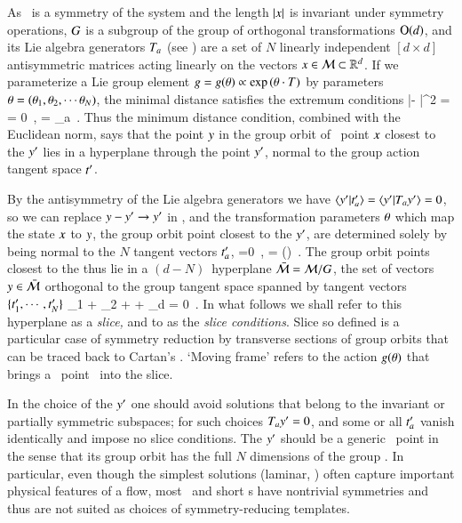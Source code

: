 As \Group\ is a symmetry of the system and the length $|x|$ is
invariant under symmetry operations, $G$ is a subgroup of the group
of orthogonal transformations $\textrm{O}(d)$, and its Lie algebra {generators}
$T_a$ (see ) are a set of $N$ linearly independent
$[d\!\times\!d]$ antisymmetric matrices acting linearly on the {\statesp}
vectors $x \in {\cal M} \subset \mathbb{R}^d$. If we parameterize a Lie group
element $g=g({\bf \theta})\propto\exp{({\ensuremath{{\bf \theta}}} \cdot \ensuremath{T})}$ by
parameters ${\bf \theta} = ({\bf \theta}_1,{\bf \theta}_2,\cdots{\bf \theta}_N)$, the minimal
distance satisfies the extremum conditions
\beq
{} |\ssp - \LieEl\slicep|^2
   =
   = 0
    \,,\qquad
	   = \Lg_a \slicep
\,.
\label{PCsectQ}
\eeq
Thus the minimum distance condition, combined with the Euclidean norm, says
that the point $y$ in the group orbit of \statesp\ point $x$
closest to the {\template} ${y'}$ lies in a hyperplane
through the point ${y'}$, normal to the group action tangent space
$t'_{}$.

By the antisymmetry of the Lie algebra generators we have
$\braket{\slicep}{\sliceTan{a}} = \braket{\slicep}{\Lg_{a}\slicep}=0$, so
we can replace $y - {y'} \to {\ensuremath{y'}}$ in , and
the transformation parameters ${\bf \theta}$ which map the state $x$ to
$y$, the group orbit point
closest to the {\template} ${y'}$, are determined solely by being
normal to the $N$ {\template} tangent vectors $t'_{a}$,
\beq
{} =0
    \,,\qquad
\sspRed = \LieEl(\gSpace) \ssp
\,.
The group orbit points closest to the {\template} thus lie in a
$(d\!-\!N)$\dmn\ hyperplane $\bar{\cal M} = {\cal M}/G$, the set of vectors
$y \in  \bar{\cal M}$ orthogonal to the group tangent space spanned by
tangent vectors $\{t'_{1},\cdots,t'_{N}\}$
\beq
\sspRed_1 + \sspRed_2
  + \cdots + \sspRed_d = 0
\,.
In what follows we shall refer to this hyperplane as a
\emph{slice,} and to   as the \emph{slice conditions}.
Slice so defined is a particular case of symmetry reduction
by transverse sections of group
orbits that can be traced back to
Cartan's \mframes{}. `Moving frame' refers to the action
$g({\bf \theta})$ that
brings a \statesp\ point \ssp\ into the slice.

In the choice of the {\template} ${y'}$ one should avoid solutions
that belong to the invariant or partially symmetric subspaces; for such
choices $T_{a}{y'}=0$, and some or all $t'_{a}$ vanish
identically and impose no slice conditions. The {\template} ${y'}$
should be a generic \statesp\ point in the sense that its group orbit has
the full $N$ dimensions of the group \Group. In particular, even though
the simplest solutions (laminar, \etc) often capture important physical
features of a flow, most \eqva\ and short \po s have nontrivial
symmetries and thus are not suited as choices of symmetry-reducing
templates.

